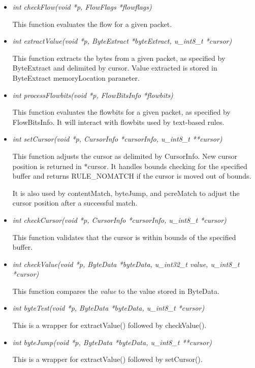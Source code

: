 \documentclass[english]{report}
\begin{document}
\begin{itemize}
\begin{itemize}
\item {\em int checkFlow(void *p, FlowFlags *flowflags)}

This function evaluates the flow for a given packet.

\item {\em int extractValue(void *p, ByteExtract *byteExtract, u\_int8\_t *cursor)}

This function extracts the bytes from a given packet, as specified by
ByteExtract and delimited by cursor.  Value extracted is stored in ByteExtract
memoryLocation paraneter.

\item {\em int processFlowbits(void *p, FlowBitsInfo *flowbits)}

This function evaluates the flowbits for a given packet, as specified by
FlowBitsInfo.  It will interact with flowbits used by text-based rules.

\item {\em int setCursor(void *p, CursorInfo *cursorInfo, u\_int8\_t **cursor)}

This function adjusts the cursor as delimited by CursorInfo.  New cursor
position is returned in *cursor.  It handles bounds checking for the specified
buffer and returns RULE\_NOMATCH if the cursor is moved out of bounds.  

It is also used by contentMatch, byteJump, and pcreMatch to adjust the cursor
position after a successful match.

\item {\em int checkCursor(void *p, CursorInfo *cursorInfo, u\_int8\_t *cursor)}

This function validates that the cursor is within bounds of the specified
buffer.

\item {\em int checkValue(void *p, ByteData *byteData, u\_int32\_t value, u\_int8\_t *cursor)}

This function compares the {\em value} to the value stored in ByteData.

\item {\em int byteTest(void *p, ByteData *byteData, u\_int8\_t *cursor)}

This is a wrapper for extractValue() followed by checkValue().

\item {\em int byteJump(void *p, ByteData *byteData, u\_int8\_t **cursor)}

This is a wrapper for extractValue() followed by setCursor().


\end{itemize}
\end{itemize}
\end{document}
